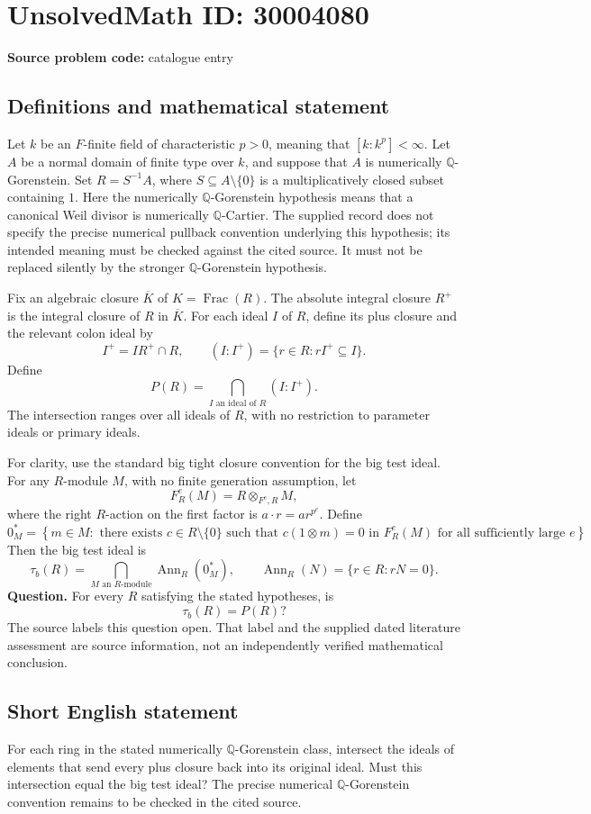 \documentclass[11pt]{article}
\newcommand{\Q}{\mathbb{Q}}
\begin{document}
\section*{UnsolvedMath ID: 30004080}
\textbf{Source problem code:} catalogue entry
\subsection{Definitions and mathematical statement}
Let \(k\) be an \(F\)-finite field of characteristic \(p>0\), meaning that \([k:k^p]<\infty\). Let \(A\) be a normal domain of finite type over \(k\), and suppose that \(A\) is numerically \(\Q\)-Gorenstein. Set \(R=S^{-1}A\), where \(S\subseteq A\setminus\{0\}\) is a multiplicatively closed subset containing \(1\). Here the numerically \(\Q\)-Gorenstein hypothesis means that a canonical Weil divisor is numerically \(\Q\)-Cartier. The supplied record does not specify the precise numerical pullback convention underlying this hypothesis; its intended meaning must be checked against the cited source. It must not be replaced silently by the stronger \(\Q\)-Gorenstein hypothesis.

Fix an algebraic closure \(\overline{K}\) of \(K=\operatorname{Frac}(R)\). The absolute integral closure \(R^+\) is the integral closure of \(R\) in \(\overline{K}\). For each ideal \(I\) of \(R\), define its plus closure and the relevant colon ideal by
\[
I^+=IR^+\cap R,
\qquad
(I:I^+)=\{r\in R:rI^+\subseteq I\}.
\]
Define
\[
P(R)=\bigcap_{I\text{ an ideal of }R}(I:I^+).
\]
The intersection ranges over all ideals of \(R\), with no restriction to parameter ideals or primary ideals.

For clarity, use the standard big tight closure convention for the big test ideal. For any \(R\)-module \(M\), with no finite generation assumption, let
\[
F_R^e(M)=R\otimes_{F^e,R}M,
\]
where the right \(R\)-action on the first factor is \(a\cdot r=ar^{p^e}\). Define
\[
0_M^*=\left\{m\in M:\text{ there exists }c\in R\setminus\{0\}\text{ such that }c(1\otimes m)=0\text{ in }F_R^e(M)\text{ for all sufficiently large }e\right\}.
\]
Then the big test ideal is
\[
\tau_b(R)=\bigcap_{M\text{ an }R\text{-module}}\operatorname{Ann}_R(0_M^*),
\qquad
\operatorname{Ann}_R(N)=\{r\in R:rN=0\}.
\]
\textbf{Question.} For every \(R\) satisfying the stated hypotheses, is
\[
\tau_b(R)=P(R)?
\]
The source labels this question open. That label and the supplied dated literature assessment are source information, not an independently verified mathematical conclusion.
\subsection{Short English statement}
For each ring in the stated numerically \(\Q\)-Gorenstein class, intersect the ideals of elements that send every plus closure back into its original ideal. Must this intersection equal the big test ideal? The precise numerical \(\Q\)-Gorenstein convention remains to be checked in the cited source.
\end{document}
